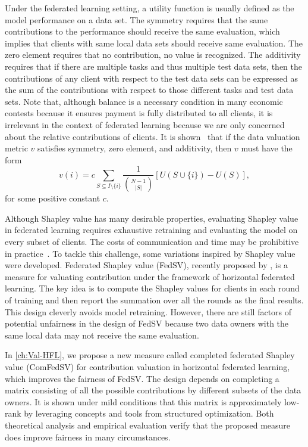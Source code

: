 Under the federated learning setting, a utility function is usually defined as the model performance on a data set. The symmetry requires that the same contributions to the performance should receive the same evaluation, which implies that clients with same local data sets should receive same evaluation. The zero element requires that no contribution, no value is recognized. The additivity requires that if there are multiple tasks and thus multiple test data sets, then the contributions of any client with respect to the test data sets can be expressed as the sum of the contributions with respect to those different tasks and test data sets. Note that, although balance is a necessary condition in many economic contests because it ensures payment is fully distributed to all clients, it is irrelevant in the context of federated learning because we are only concerned about the relative contributions of clients. It is shown~\cite{dubey1975uniqueness,ghorbani2019data} that if the data valuation metric $v$ satisfies symmetry, zero element, and additivity, then $v$ must have the form
\begin{equation} \label{eq:shapley}
    v(i) = c \sum\limits_{S \subseteq I \setminus\{i\}} \frac{1}{\binom{N-1}{|S|}} \left[U(S\cup\{i\}) - U(S)\right],
\end{equation}
for some positive constant $c$.  

Although Shapley value has many desirable properties, evaluating Shapley value in federated learning requires exhaustive retraining and evaluating the model on every subset of clients. The costs of communication and time may be prohibitive in practice~\cite{song2019profit}. To tackle this challenge, some variations inspired by Shapley value were developed. Federated Shapley value (FedSV), recently proposed by \citet{wang2020principled}, is a measure for valuating contribution under the framework of horizontal federated learning. The key idea is to compute the Shapley values for clients in each round of training and then report the summation over all the rounds as the final results. This design cleverly avoids model retraining. However, there are still factors of potential unfairness in the design of FedSV because two data owners with the same local data may not receive the same evaluation. 

In \autoref{ch:Val-HFL}, we propose a new measure called completed federated Shapley value (ComFedSV) for contribution valuation in horizontal federated learning, which improves the fairness of FedSV. The design depends on completing a matrix consisting of all the possible contributions by different subsets of the data owners. It is shown under mild conditions that this matrix is approximately low-rank by leveraging concepts and tools from structured optimization. Both theoretical analysis and empirical evaluation verify that the proposed measure does improve fairness in many circumstances.

